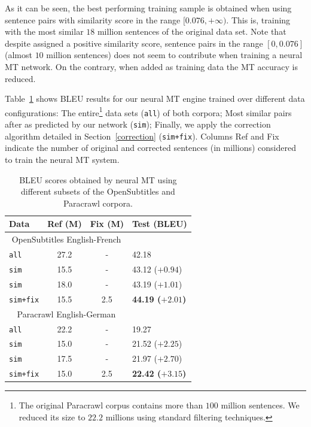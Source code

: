 \documentclass[11pt,a4paper]{article}
\begin{document}
As it can be seen, the best performing training sample is obtained when using sentence pairs with similarity score in the range $[0.076, +\infty)$. 
This is, training with the most similar $18$ million sentences of the original data set. 
Note that despite assigned a positive similarity score, sentence pairs in the range $[0, 0.076]$ (almost $10$ million sentences) does not seem to contribute when training a neural MT network. 
On the contrary, when added as training data the MT accuracy is reduced.

Table~\ref{results} shows BLEU results for our neural MT engine trained over different data configurations:
The entire\footnote{The original Paracrawl corpus contains more than $100$ million sentences. We reduced its size to $22.2$ millions using standard filtering techniques.} data sets (\texttt{all}) of both corpora; 
Most similar pairs after as predicted by our network (\texttt{sim}); 
Finally, we apply the correction algorithm detailed in Section~\ref{correction} (\texttt{sim+fix}).
Columns Ref and Fix indicate the number of original and corrected sentences (in millions) considered to train the neural MT system.

\begin{table}[h!]
\small
\center
\begin{tabular}{lccl}
\hline
\bf Data & \bf Ref (M) & \bf Fix (M) & \bf Test (BLEU) \\ %
\hline
\multicolumn{3}{c}{\scriptsize{OpenSubtitles English-French}} \\
\texttt{all}                   & 27.2 & - & 42.18 \\
\texttt{sim}            & 15.5 & - & 43.12  ($+0.94$)\\
\texttt{sim}           & 18.0 & - & 43.19  ($+1.01$)\\
\texttt{sim+fix}     & 15.5 & 2.5 & \bf 44.19 ($+2.01$)\\
\hline
\multicolumn{3}{c}{\scriptsize{Paracrawl English-German}} \\
\texttt{all}                  & 22.2 & - & 19.27 \\ 
\texttt{sim}           & 15.0 & - & 21.52 ($+2.25$)\\
\texttt{sim}           & 17.5 & - & 21.97 ($+2.70$)\\
\texttt{sim+fix}   & 15.0 & 2.5 & \bf 22.42 ($+3.15$) \\
\hline
\end{tabular}
\caption{BLEU scores obtained by neural MT using different subsets of the OpenSubtitles and Paracrawl corpora.}
\label{results}
\end{table}
\end{document}
